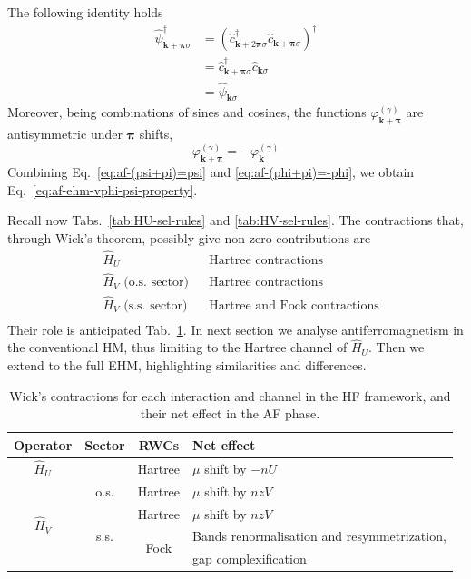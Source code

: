 \begin{tabproof}
	The following identity holds
	\begin{align}
		\hat \psi_{\mathbf{k}+\bm{\pi}\sigma}^\dagger &= \left(
		\hat c_{\mathbf{k}+2\bm{\pi}\sigma}^\dagger \hat c_{\mathbf{k}+\bm{\pi}\sigma}
		\right)^\dagger \nonumber \\
		&= \hat c_{\mathbf{k}+\bm{\pi}\sigma}^\dagger \hat c_{\mathbf{k}\sigma} \nonumber \\
		&= \hat \psi_{\mathbf{k}\sigma} \label{eq:af-(psi+pi)=psi}
	\end{align}
	Moreover, being combinations of sines and cosines, the functions $\varphi_{\mathbf{k}+\bm{\pi}}^{(\gamma)}$ are antisymmetric under $\bm{\pi}$ shifts,
	\begin{equation}\label{eq:af-(phi+pi)=-phi}
		\varphi_{\mathbf{k}+\bm{\pi}}^{(\gamma)} = -\varphi_\mathbf{k}^{(\gamma)}
	\end{equation}
	Combining Eq.~\eqref{eq:af-(psi+pi)=psi} and \eqref{eq:af-(phi+pi)=-phi}, we obtain Eq.~\eqref{eq:af-ehm-vphi-psi-property}.
\end{tabproof}
Recall now Tabs.~\ref{tab:HU-sel-rules} and \ref{tab:HV-sel-rules}. The contractions that, through Wick's theorem, possibly give non-zero contributions are
\[
\begin{aligned}
	&\hat H_U 
	&&\text{Hartree contractions} \\
	&\hat H_V \text{ (o.s. sector)}
	&&\text{Hartree contractions} \\
	&\hat H_V \text{ (s.s. sector)}
	&&\text{Hartree and Fock contractions} \\
\end{aligned}	
\]
Their role is anticipated Tab.~\ref{tab:af-RWCs}. In next section we analyse antiferromagnetism in the conventional HM, thus limiting to the Hartree channel of $\hat H_U$. Then we extend to the full EHM, highlighting similarities and differences.

\begin{table}[t]
	\centering
	\begin{tabular}{c c c l}
		\textbf{Operator} & \textbf{Sector} & \textbf{RWCs} & \textbf{Net effect} \\
		\midrule
		$\hat H_U$ && Hartree & $\mu$ shift by $-nU$ \\
		\midrule
		\multirow{4}{*}{$\hat H_V$} & o.s. & Hartree & $\mu$ shift by $nzV$ \\[0.5em]
		& \multirow{3}{*}{s.s.} & Hartree & $\mu$ shift by $nzV$\\
		&& \multirow{2}{*}{Fock} & Bands renormalisation and resymmetrization,\\
		& & & gap complexification \\
		\midrule
	\end{tabular}
	\caption{Wick's contractions for each interaction and channel in the HF framework, and their net effect in the AF phase.}
	\label{tab:af-RWCs}
\end{table}

